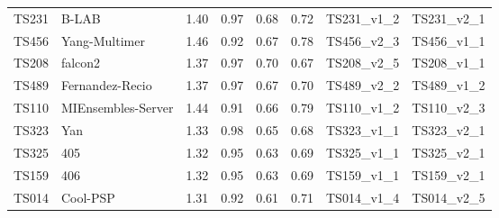 \begin{table}[ht]
{\begin{tabular}{llllllll}
TS231 & B-LAB & 1.40 & 0.97 & 0.68 & 0.72 & TS231\_v1\_2 & TS231\_v2\_1 \\ 
TS456 & Yang-Multimer & 1.46 & 0.92 & 0.67 & 0.78 & TS456\_v2\_3 & TS456\_v1\_1 \\ 
TS208 & falcon2 & 1.37 & 0.97 & 0.70 & 0.67 & TS208\_v2\_5 & TS208\_v1\_1 \\ 
TS489 & Fernandez-Recio & 1.37 & 0.97 & 0.67 & 0.70 & TS489\_v2\_2 & TS489\_v1\_2 \\ 
TS110 & MIEnsembles-Server & 1.44 & 0.91 & 0.66 & 0.79 & TS110\_v1\_2 & TS110\_v2\_3 \\ 
TS323 & Yan & 1.33 & 0.98 & 0.65 & 0.68 & TS323\_v1\_1 & TS323\_v2\_1 \\ 
TS325 & 405 & 1.32 & 0.95 & 0.63 & 0.69 & TS325\_v1\_1 & TS325\_v2\_1 \\ 
TS159 & 406 & 1.32 & 0.95 & 0.63 & 0.69 & TS159\_v1\_1 & TS159\_v2\_1 \\ 
TS014 & Cool-PSP & 1.31 & 0.92 & 0.61 & 0.71 & TS014\_v1\_4 & TS014\_v2\_5 \\ 
\bottomrule
\end{tabular}%
}
\end{table}
